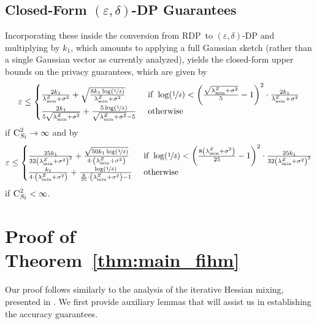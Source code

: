 \documentclass[11pt]{article}
\theoremstyle{definition}
\theoremstyle{plain}
\providecommand{\theoremref}[1]{Theorem~\ref{#1}}
\newcommand{\eps}{{\varepsilon}}
\newcommand{\RDP}{{\normalfont RDP}~}
\renewcommand{\eps}{\varepsilon}
\begin{document}
\subsection{Closed-Form $(\eps, \delta)$-DP Guarantees}
Incorporating these inside the conversion from \RDP to $(\eps, \delta)$-DP \citep[Lemma.~6]{bun2018composable} and multiplying by $k_1$, which amounts to applying a full Gaussian sketch (rather than a single Gaussian vector as currently analyzed), yields the closed-form upper bounds on the privacy guarantees, which are given by 
\begin{align}
    \eps \leq \begin{cases}
        \frac{2k_1}{\lambda^{Z}_{\min} + \sigma^2} + \sqrt{\frac{8k_1\log(\nicefrac{1}{\delta})}{\lambda^{Z}_{\min} + \sigma^2}}\ &\mathrm{if} \ \log(\nicefrac{1}{\delta}) < \left(\frac{\sqrt{\lambda^{Z}_{\min} + \sigma^2}}{5} - 1\right)^2\cdot\frac{2k_1}{\lambda^{Z}_{\min} + \sigma^2}\\
        \frac{2k_1}{5\sqrt{\lambda^{Z}_{\min} + \sigma^2}} + \frac{5\log(\nicefrac{1}{\delta})}{\sqrt{\lambda^{Z}_{\min} + \sigma^2} - 5}\ &\mathrm{otherwise}
    \end{cases}
\end{align}
if $\textsc{C}^2_{S_{\mathrm{f}}} \to \infty$ and by 
\begin{align}
    \label{eq:tcdp_conversion_finite_C}
    \eps \leq \begin{cases}
        \frac{25k_1}{32\left(\lambda^{Z}_{\min} + \sigma^2\right)^2} + \frac{\sqrt{50k_1\log(\nicefrac{1}{\delta})}}{4\cdot \left(\lambda^{Z}_{\min} + \sigma^2\right)}\ &\mathrm{if} \ \log(\nicefrac{1}{\delta}) < \left(\frac{8\left(\lambda^{Z}_{\min} + \sigma^2\right)}{25} - 1\right)^2\cdot \frac{25k_1}{32\left(\lambda^{Z}_{\min} + \sigma^2\right)^2}\\
        \frac{k_1}{4\cdot \left(\lambda^{Z}_{\min} + \sigma^2\right)} + \frac{\log(\nicefrac{1}{\delta})}{\frac{8}{25}\cdot \left(\lambda^{Z}_{\min} + \sigma^2\right) - 1}\ &\mathrm{otherwise}
    \end{cases}    
\end{align}
if $\textsc{C}^2_{S_{\mathrm{f}}} < \infty$. 
% 
\section{Proof of \theoremref{thm:main_fihm}}
\label{app:proof_fihm}
Our proof follows similarly to the analysis of the iterative Hessian mixing, presented in \citet{lev2026near}. We first provide auxiliary lemmas that will assist us in establishing the accuracy guarantees. 
\end{document}
